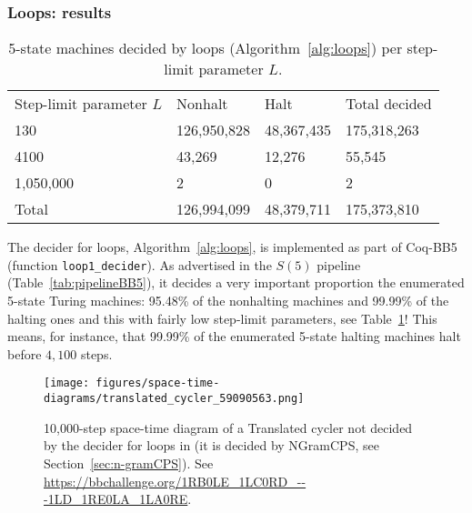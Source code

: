 \subsubsection{Loops: results}\label{sec:loops:results}

\begin{table}[h!]
  \centering
  \begin{tabular}{llll}
    Step-limit parameter $L$ & Nonhalt                         & Halt                           & Total decided \\
    130                      & 126,950,828                     & 48,367,435                     & 175,318,263   \\
    4100                     & 43,269                          & 12,276                         & 55,545        \\
    1,050,000                & 2                               & 0                              & 2             \\ \hline
    Total                    & \multicolumn{1}{r}{126,994,099} & \multicolumn{1}{r}{48,379,711} & 175,373,810
  \end{tabular}
  \caption{5-state machines decided by loops (Algorithm~\ref{alg:loops}) per step-limit parameter $L$.}\label{tab:paramsLoops}
\end{table}

The decider for loops, Algorithm~\ref{alg:loops}, is implemented as part of Coq-BB5 (function \texttt{loop1\_decider}). As advertised in the $S(5)$ pipeline (Table~\ref{tab:pipelineBB5}), it decides a very important proportion the enumerated 5-state Turing machines: 95.48\% of the nonhalting machines and 99.99\% of the halting ones and this with fairly low step-limit parameters, see Table~\ref{tab:paramsLoops}! This means, for instance, that 99.99\% of the enumerated 5-state halting machines halt before $4,100$ steps.

\begin{figure}
  \centering
  \texttt{[image: figures/space-time-diagrams/translated\_cycler\_59090563.png]}

  \caption{10,000-step space-time diagram of a Translated cycler not decided by the decider for loops in \CoqBB (it is decided by NGramCPS, see Section~\ref{sec:n-gramCPS}). See \url{https://bbchallenge.org/1RB0LE_1LC0RD_---1LD_1RE0LA_1LA0RE}.}\label{fig:translated-cyclers-more}
\end{figure}


